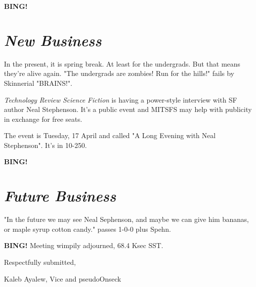 \documentclass[10pt]{article}
\newcommand{\bing}{{\bf BING!} }
\newcommand{\goto}[1]{\bing \vskip 12pt \section*{{\em{#1}}}}
\newcommand{\ps}{ plus Spehn\xspace}
\newcommand{\onseck}{Kaleb Ayalew, Vice and pseudoOnseck}
\begin{document}
\goto{New Business}

In the present, it is spring break.  At least for the undergrads.  But that
means they're alive again.  "The undergrads are zombies!  Run for the hills!"
fails by Skinnerial "BRAINS!".

\emph{Technology Review Science Fiction} is having a power-style interview
with SF author Neal Stephenson.  It's a public event and MITSFS  may help 
with publicity in exchange for free seats. 

The event is Tuesday, 17 April and called "A Long Evening with Neal Stephenson".
It's in 10-250.


\goto{Future Business}

"In the future we may see Neal Sephenson, and maybe we can give him bananas, or
maple syrup cotton candy." passes 1-0-0\ps.


\bing
\noindent
Meeting wimpily adjourned, 68.4 Ksec SST.

\vspace{18pt}

\centerline{Respectfully submitted,}
\centerline{\onseck}
\end{document}
